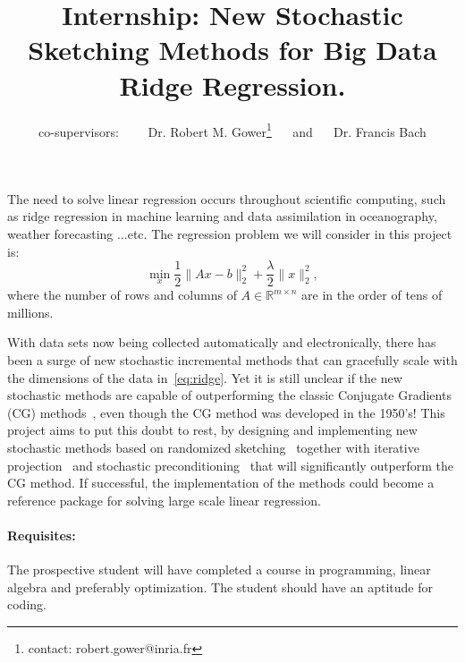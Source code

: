 \documentclass[11pt]{article}
\title{Internship: New Stochastic Sketching Methods for Big Data Ridge Regression.}
\author{co-supervisors:$\qquad$  Dr. Robert M. Gower\footnote{contact: robert.gower@inria.fr} $\quad$ and $\quad$ Dr. Francis Bach }
\newcommand{\R}{\mathbb{R}}
\newcommand{\norm}[1]{\lVert#1\rVert}
\begin{document}
\maketitle


The need to solve linear regression occurs throughout scientific computing, such as ridge regression in machine learning and data assimilation in oceanography, weather forecasting ...etc. The regression problem we will consider in this project is: 
\begin{equation}\label{eq:ridge}
 \min_x \frac{1}{2}\norm{Ax-b}_2^2 + \frac{\lambda}{2}\norm{x}_2^2,
\end{equation}
where the number of rows and columns of $A  \in \R^{m\times n}$ are in the order of tens of millions.
 

With data sets now being collected automatically and electronically, there has been a surge of new stochastic incremental methods that can gracefully scale with the dimensions of the data in~\eqref{eq:ridge}. Yet it is still unclear if the new stochastic methods are capable of outperforming the classic Conjugate Gradients (CG) methods~\cite{Hestenes1952}, even though the CG method was developed in the 1950's! This project aims to put this doubt to rest, by designing and implementing new stochastic methods based on randomized sketching~\cite{Pilanci2015,Pilanci2014} together with iterative projection~\cite{Gower2015} and stochastic preconditioning~\cite{Gower2016} that will significantly outperform the CG method. If successful, the implementation of the methods could become a reference package for solving large scale linear regression.



\paragraph{Requisites:} The prospective student will have completed a course in  programming, linear algebra and preferably optimization. The student should have an aptitude for coding.
\end{document}
